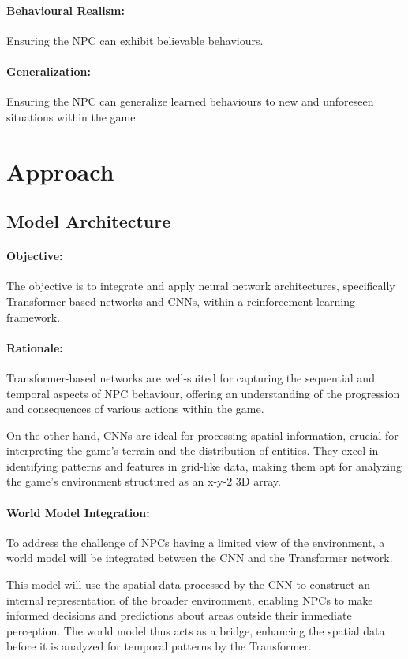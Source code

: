 \paragraph{Behavioural Realism:}
Ensuring the NPC can exhibit believable behaviours.
\paragraph{Generalization:}
Ensuring the NPC can generalize learned behaviours to new and unforeseen situations within the game.

\section{Approach}

\subsection{Model Architecture}
\paragraph{Objective:}
The objective is to integrate and apply neural network architectures, specifically Transformer-based networks and CNNs, within a reinforcement learning framework.

\paragraph{Rationale:}
Transformer-based networks are well-suited for capturing the sequential and temporal aspects of NPC behaviour, offering an understanding of the progression and consequences of various actions within the game.

On the other hand, CNNs are ideal for processing spatial information, crucial for interpreting the game’s terrain and the distribution of entities. They excel in identifying patterns and features in grid-like data, making them apt for analyzing the game's environment structured as an x-y-2 3D array.

\paragraph{World Model Integration:}
To address the challenge of NPCs having a limited view of the environment, a world model will be integrated between the CNN and the Transformer network.

This model will use the spatial data processed by the CNN to construct an internal representation of the broader environment, enabling NPCs to make informed decisions and predictions about areas outside their immediate perception. The world model thus acts as a bridge, enhancing the spatial data before it is analyzed for temporal patterns by the Transformer.

